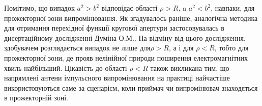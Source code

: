 Помітимо, що випадок $ a^2 > b^2 $ відповідає області $ \rho > R $, a 
$ a^2 < b^2 $, навпаки, для прожекторної зони випромінювання. Як 
згадувалось раніше, аналогічна методика для отримання перехідної функції 
кругової апертури застосовувалась в дисертаційному дослідженні Думіна О.М.. 
На відміну від цього дослідження, здобувачем розглядається випадок не лише 
для$ \rho > R $, а і для $ \rho < R $, тобто для прожекторної зони, де 
прояв нелінійної природи поширення електромагнітних хвиль найбільший. 
Цікавість до області $ \rho < R $ також викликана тим, що напрямлені 
антени імпульсного випромінювання на практиці найчастіше використовуються 
саме за сценарієм, коли приймач чи випромінювач знаходяться в прожекторній 
зоні.
%
%
%
%
